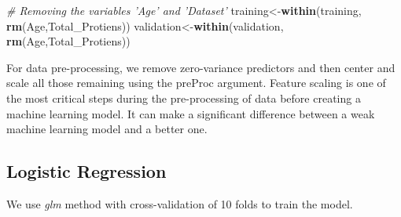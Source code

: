 \documentclass[]{article}
\newenvironment{Shaded}{\begin{snugshade}}{\end{snugshade}}
\newcommand{\CommentTok}[1]{\textcolor[rgb]{0.56,0.35,0.01}{\textit{#1}}}
\newcommand{\DataTypeTok}[1]{\textcolor[rgb]{0.13,0.29,0.53}{#1}}
\newcommand{\DecValTok}[1]{\textcolor[rgb]{0.00,0.00,0.81}{#1}}
\newcommand{\KeywordTok}[1]{\textcolor[rgb]{0.13,0.29,0.53}{\textbf{#1}}}
\newcommand{\NormalTok}[1]{#1}
\newcommand{\OperatorTok}[1]{\textcolor[rgb]{0.81,0.36,0.00}{\textbf{#1}}}
\newcommand{\StringTok}[1]{\textcolor[rgb]{0.31,0.60,0.02}{#1}}
\begin{document}
\begin{Shaded}
\begin{Highlighting}[]
\CommentTok{# Removing the variables 'Age' and 'Dataset' }
\NormalTok{training<-}\KeywordTok{within}\NormalTok{(training, }\KeywordTok{rm}\NormalTok{(Age,Total_Protiens))}
\NormalTok{validation<-}\KeywordTok{within}\NormalTok{(validation, }\KeywordTok{rm}\NormalTok{(Age,Total_Protiens))}
\end{Highlighting}
\end{Shaded}

For data pre-processing, we remove zero-variance predictors and then
center and scale all those remaining using the preProc argument. Feature
scaling is one of the most critical steps during the pre-processing of
data before creating a machine learning model. It can make a significant
difference between a weak machine learning model and a better one.

\subsection{Logistic Regression}

We use \emph{glm} method with cross-validation of 10 folds to train the
model.

\begin{Shaded}
\end{Shaded}
\end{document}
